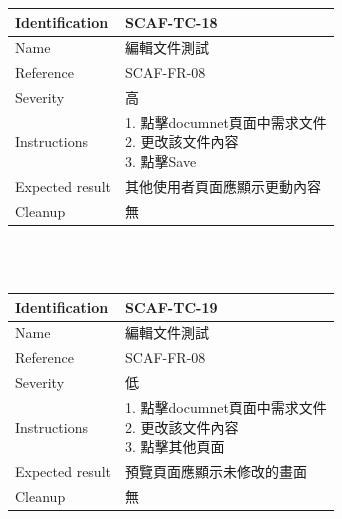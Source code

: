 \documentclass{report}
\begin{document}
\begin{tabularx}{\textwidth}{
  |p{}%
  |p{}|%
  }
  \hline
  \centering Identification &  SCAF-TC-18 \\
  \hline
  \centering Name & 編輯文件測試 \\
  \hline
  \centering Reference & SCAF-FR-08 \\
  \hline
  \centering Severity & 高 \\
  \hline
  \centering Instructions & 
  \makecell[l]{
    1. 點擊documnet頁面中需求文件 \\
    2. 更改該文件內容  \\
    3. 點擊Save 
  }\\
  \hline
  \centering Expected result & 其他使用者頁面應顯示更動內容 \\
  \hline
  \centering Cleanup & 無 \\
  \hline
\end{tabularx}
\\
\newline
\\
\begin{tabularx}{\textwidth}{
  |p{}%
  |p{}|%
  }
  \hline
  \centering Identification &  SCAF-TC-19 \\
  \hline
  \centering Name & 編輯文件測試 \\
  \hline
  \centering Reference & SCAF-FR-08 \\
  \hline
  \centering Severity & 低 \\
  \hline
  \centering Instructions & 
  \makecell[l]{
    1. 點擊documnet頁面中需求文件 \\
    2. 更改該文件內容  \\
    3. 點擊其他頁面 
  }\\
  \hline
  \centering Expected result & 預覽頁面應顯示未修改的畫面 \\
  \hline
  \centering Cleanup & 無 \\
  \hline
\end{tabularx}
\\
\newline
\\
\end{document}
